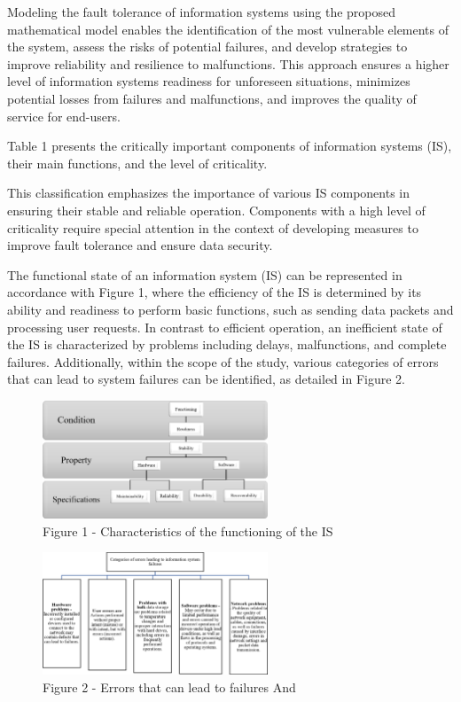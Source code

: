 \begin{multicols}{2}
Modeling the fault tolerance of information systems using the proposed
mathematical model enables the identification of the most vulnerable
elements of the system, assess the risks of potential failures, and
develop strategies to improve reliability and resilience to
malfunctions. This approach ensures a higher level of information
systems\textquotesingle{} readiness for unforeseen situations, minimizes
potential losses from failures and malfunctions, and improves the
quality of service for end-users.

Table 1 presents the critically important components of information
systems (IS), their main functions, and the level of criticality.

This classification emphasizes the importance of various IS components
in ensuring their stable and reliable operation. Components with a high
level of criticality require special attention in the context of
developing measures to improve fault tolerance and ensure data security.

The functional state of an information system (IS) can be represented in
accordance with Figure 1, where the efficiency of the IS is determined
by its ability and readiness to perform basic functions, such as sending
data packets and processing user requests. In contrast to efficient
operation, an inefficient state of the IS is characterized by problems
including delays, malfunctions, and complete failures. Additionally,
within the scope of the study, various categories of errors that can
lead to system failures can be identified, as detailed in Figure 2.
\end{multicols}

\begin{figure}[H]
	\centering
	\includegraphics[width=0.6\textwidth]{assets/43}
	\caption*{Figure 1 - Characteristics of the functioning of the IS}
\end{figure}

\begin{figure}[H]
	\centering
	\includegraphics[width=0.6\textwidth]{assets/44}
	\caption*{Figure 2 - Errors that can lead to failures And}
\end{figure}

